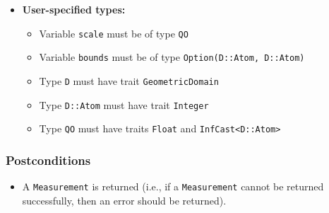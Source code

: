 \documentclass[11pt,a4paper]{article}
\begin{document}
\begin{itemize}
    \item \textbf{User-specified types:}
    \begin{itemize}
        \item Variable \texttt{scale} must be of type \texttt{QO}
        \item Variable \texttt{bounds} must be of type \texttt{Option(D::Atom, D::Atom)}
        \item Type \texttt{D} must have trait \texttt{GeometricDomain}
        \item Type \texttt{D::Atom} must have trait \texttt{Integer}
        \item Type \texttt{QO} must have traits \texttt{Float} and \texttt{InfCast<D::Atom>}
    \end{itemize}
\end{itemize}

\subsubsection*{Postconditions}

\begin{itemize}
    \item A \texttt{Measurement} is returned (i.e., if a \texttt{Measurement} cannot be returned successfully, then an error should be returned).
\end{itemize}
\end{document}
